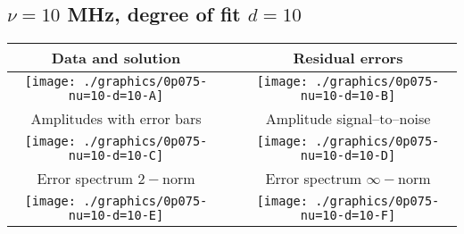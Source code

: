 

% 

\clearpage{}
\break{}

\subsection{$\nu = 10$ MHz, degree of fit $d = 10$}

\begin{table}[h]
    \begin{center}
        \begin{tabular}{ccc}
            Data and solution & \quad & Residual errors \\\hline
            \texttt{[image: ./graphics/0p075-nu=10-d=10-A]} &&
            \texttt{[image: ./graphics/0p075-nu=10-d=10-B]} \\[15pt]
            Amplitudes with error bars && Amplitude signal--to--noise \\\hline
            \texttt{[image: ./graphics/0p075-nu=10-d=10-C]} &&
            \texttt{[image: ./graphics/0p075-nu=10-d=10-D]} \\[15pt]
            Error spectrum $2-$norm && Error spectrum $\infty-$norm \\\hline
            \texttt{[image: ./graphics/0p075-nu=10-d=10-E]} &&
            \texttt{[image: ./graphics/0p075-nu=10-d=10-F]} \\[15pt]
        \end{tabular}
    \end{center}
\label{fig:elev=75, nu=10}
\end{table}



\endinput
